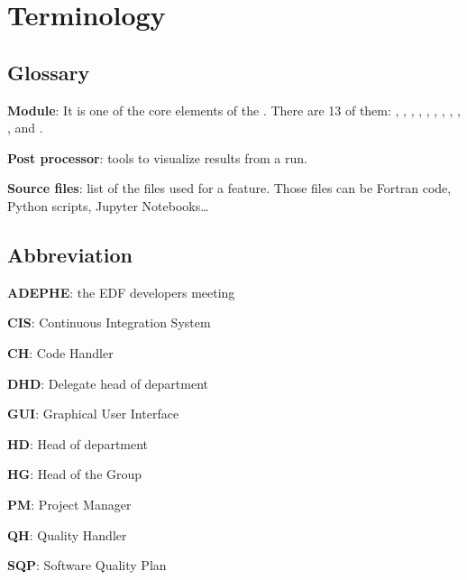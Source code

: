\chapter{Terminology}

\section{Glossary}

\textbf{Module}: It is one of the core elements of the \telemacsystem. There
are 13 of them: , , \tomawac, \artemis, \gaia, \khione,
\postel, \bief, \stbtel, \waqtel{}, \mascaret and \courlis.

\textbf{Post processor}: tools to visualize results from a \telemacsystem{}
run.

\textbf{Source files}: list of the files used for a feature. Those files can be
Fortran code, Python scripts, Jupyter Notebooks\ldots

\section{Abbreviation}

\textbf{ADEPHE}: the \telemacsystem{} EDF developers meeting

\textbf{CIS}: Continuous Integration System

\textbf{CH}: Code Handler

\textbf{DHD}: Delegate head of department

\textbf{GUI}: Graphical User Interface

\textbf{HD}: Head of department

\textbf{HG}: Head of the Group

\textbf{PM}: Project Manager

\textbf{QH}: Quality Handler

\textbf{SQP}: Software Quality Plan

